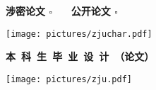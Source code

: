 \thispagestyle{empty}
\setcounter{page}{-1}

\begin{flushright}
  \bfseries 涉密论文 $\square$ ~~ 公开论文 $\square$ 
\end{flushright}

\vskip 10mm

\begin{center}
    \texttt{[image: pictures/zjuchar.pdf]}
\end{center}

\begin{center}
     \heiti \bfseries
      本~科~生~毕~业~设~计~（论文）
\end{center}

\vskip 20pt

\begin{center}
    \texttt{[image: pictures/zju.pdf]}
\end{center}

\vskip 20pt

{
    \newcommand{\CoverTitle}{
        题目      &  \uline{\hfill \Title{} \hfill} \\
        ~ & ~\\
    }
}
{
    \newcommand{\CoverTitle}{
        题目      &  \uline{\hfill \TitleLineOne{} \hfill} \\
        ~        & \uline{\hfill \TitleLineTwo{} \hfill} \\
    }
}

